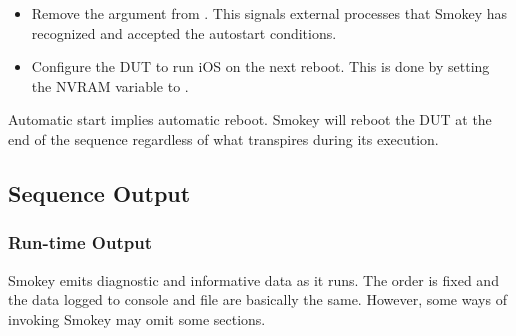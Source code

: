 \begin{itemize}

\item Remove the  argument from .  This signals
external processes that Smokey has recognized and accepted the autostart
conditions.

\item Configure the DUT to run iOS on the next reboot.  This is done by setting
the  NVRAM variable to .

\end{itemize}

Automatic start implies automatic reboot.  Smokey will reboot the DUT at the
end of the sequence regardless of what transpires during its execution.

\subsection{Sequence Output}
\label{subsec:SeqOut}

\subsubsection{Run-time Output}

Smokey emits diagnostic and informative data as it runs.  The order is fixed
and the data logged to console and file are basically the same.  However, some
ways of invoking Smokey may omit some sections.

